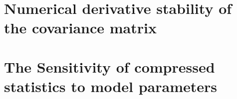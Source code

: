 



\section{Numerical derivative stability of the covariance matrix}
\section{The Sensitivity of compressed statistics to model parameters}